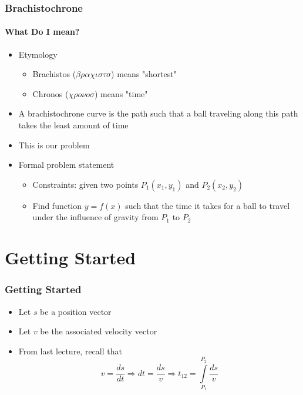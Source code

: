 \documentclass[12pt]{beamer}
\begin{document}
\begin{frame}
\frametitle{Brachistochrone}
\framesubtitle{What Do I mean?}
\begin{itemize}
    \item Etymology
        \pause
        \begin{itemize}
            \item Brachistos ($ \beta \rho \alpha \chi \iota \sigma \tau \sigma $) means "shortest"
            \pause
            \item Chronos ($\chi \rho o \nu o \sigma $) means "time"
        \end{itemize}
    \pause
    \item A brachistochrone curve is the path such that a ball traveling along this path takes the least amount of time
    \pause
    \item This is our problem
    \pause
    \item Formal problem statement
    \begin{itemize}
        \pause
        \item Constraints: given two points $P_1 (x_1, y_1)$ and $P_2 (x_2, y_2)$
        \pause
        \item Find function $y = f(x)$ such that the time it takes for a ball to travel under the influence of gravity from $P_1$ to $P_2$
    \end{itemize}
\end{itemize}
\end{frame}

\section{Getting Started}

\begin{frame}
\frametitle{Getting Started}
\begin{itemize}
    \item Let $s$ be a position vector
    \pause
    \item Let $v$ be the associated velocity vector
    \pause
    \item From last lecture, recall that
    $$
    v = \frac{ds}{dt} \Rightarrow dt = \frac{ds}{v} \Rightarrow t_{12} = \int \limits_{P_1}^{P_2} \frac{ds}{v}
    $$
\end{itemize}
\end{frame}
\end{document}

